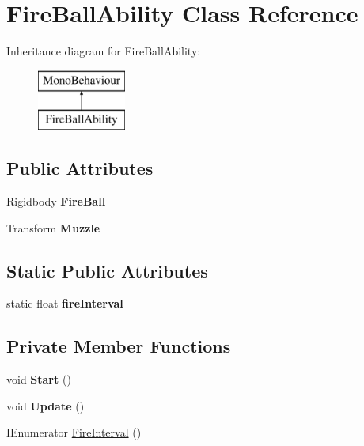 \hypertarget{class_fire_ball_ability}{}\section{Fire\+Ball\+Ability Class Reference}
\label{class_fire_ball_ability}
Inheritance diagram for Fire\+Ball\+Ability\+:\begin{figure}[H]
\begin{center}
\leavevmode
\includegraphics[height=2.000000cm]{class_fire_ball_ability}
\end{center}
\end{figure}
\subsection*{Public Attributes}
\begin{DoxyCompactItemize}
\item 
\mbox{\label{class_fire_ball_ability_af58f893c7af70bf12a2069eaaca60480}} 
Rigidbody {\bfseries Fire\+Ball}
\item 
\mbox{\label{class_fire_ball_ability_a84b6182c7a0049d6734beda9f76d73ac}} 
Transform {\bfseries Muzzle}
\end{DoxyCompactItemize}
\subsection*{Static Public Attributes}
\begin{DoxyCompactItemize}
\item 
\mbox{\label{class_fire_ball_ability_a5cc425f375ac49345f6f0cf7dcf21975}} 
static float {\bfseries fire\+Interval}
\end{DoxyCompactItemize}
\subsection*{Private Member Functions}
\begin{DoxyCompactItemize}
\item 
\mbox{\label{class_fire_ball_ability_ab15512573aba024256594f0dfbe1346d}} 
void {\bfseries Start} ()
\item 
\mbox{\label{class_fire_ball_ability_a6879214cfd8479c95150408a19da98a2}} 
void {\bfseries Update} ()
\item 
I\+Enumerator \hyperlink{class_fire_ball_ability_af7a5f8e3ea3518a2f8c7845375dd63a2}{Fire\+Interval} ()
\end{DoxyCompactItemize}
